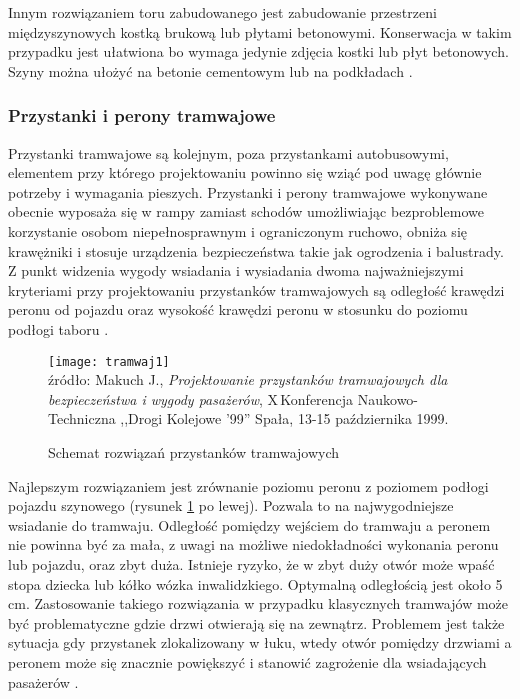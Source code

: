 \documentclass[twoside,12pt]{article}
\begin{document}
	Innym rozwiązaniem toru zabudowanego jest zabudowanie przestrzeni międzyszynowych kostką brukową lub płytami betonowymi. Konserwacja w takim przypadku jest ułatwiona bo wymaga jedynie zdjęcia kostki lub płyt betonowych. Szyny można ułożyć na betonie cementowym lub na podkładach \cite{czauderna}. 
	
	
	\subsubsection{Przystanki i perony tramwajowe}
	Przystanki tramwajowe są kolejnym, poza przystankami autobusowymi, elementem przy którego projektowaniu powinno się wziąć pod uwagę głównie potrzeby i wymagania pieszych. Przystanki i perony tramwajowe wykonywane obecnie wyposaża się w rampy zamiast schodów umożliwiając bezproblemowe korzystanie osobom niepełnosprawnym i ograniczonym ruchowo, obniża się krawężniki i stosuje urządzenia bezpieczeństwa takie jak ogrodzenia i balustrady. Z punkt widzenia wygody wsiadania i wysiadania dwoma najważniejszymi kryteriami przy projektowaniu przystanków tramwajowych są odległość krawędzi peronu od pojazdu oraz wysokość krawędzi peronu w stosunku do poziomu podłogi taboru \cite{makuch2}. 
	
		\begin{figure}[H]
		\centering
		\caption{Schemat rozwiązań przystanków tramwajowych}
		\texttt{[image: tramwaj1]}\\
		\footnotesize{źródło: 	Makuch J., \emph{Projektowanie przystanków tramwajowych dla bezpieczeństwa i wygody pasażerów}, X\,Konferencja Naukowo-Techniczna ,,Drogi Kolejowe '99'' Spała, 13-15 października 1999. \cite{makuch2}}
		\label{tramwaj1}
	\end{figure}
	
	Najlepszym rozwiązaniem jest zrównanie poziomu peronu z poziomem podłogi pojazdu szynowego (rysunek \ref{tramwaj1} po lewej). Pozwala to na najwygodniejsze wsiadanie do tramwaju. Odległość pomiędzy wejściem do tramwaju a peronem nie powinna być za mała, z uwagi na możliwe niedokładności wykonania peronu lub pojazdu, oraz zbyt duża. Istnieje ryzyko, że w zbyt duży otwór może wpaść stopa dziecka lub kółko wózka inwalidzkiego. Optymalną odległością jest około 5 cm. Zastosowanie takiego rozwiązania w przypadku klasycznych tramwajów może być problematyczne gdzie drzwi otwierają się na zewnątrz. Problemem jest także sytuacja gdy przystanek zlokalizowany w łuku, wtedy otwór pomiędzy drzwiami a peronem może się znacznie powiększyć i stanowić zagrożenie dla wsiadających pasażerów \cite{makuch2}.
	
\end{document}
